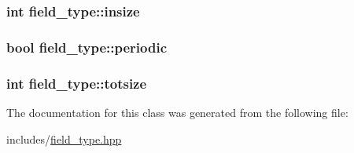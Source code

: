 \subsubsection[{\texorpdfstring{insize}{insize}}]{\setlength{\rightskip}{0pt plus 5cm}int field\+\_\+type\+::insize\hspace{0.3cm}{\ttfamily [protected]}}\hypertarget{classfield__type_adcbc745f653a086ececd263baddde7f1}{}\label{classfield__type_adcbc745f653a086ececd263baddde7f1}
\subsubsection[{\texorpdfstring{periodic}{periodic}}]{\setlength{\rightskip}{0pt plus 5cm}bool field\+\_\+type\+::periodic\hspace{0.3cm}{\ttfamily [protected]}}\hypertarget{classfield__type_a44d8b06e823939f2dda6706cb38a3280}{}\label{classfield__type_a44d8b06e823939f2dda6706cb38a3280}
\subsubsection[{\texorpdfstring{totsize}{totsize}}]{\setlength{\rightskip}{0pt plus 5cm}int field\+\_\+type\+::totsize\hspace{0.3cm}{\ttfamily [protected]}}\hypertarget{classfield__type_ad74b0d86e6384925090cdf090f1e90f5}{}\label{classfield__type_ad74b0d86e6384925090cdf090f1e90f5}


The documentation for this class was generated from the following file\+:\begin{DoxyCompactItemize}
\item 
includes/\hyperlink{field__type_8hpp}{field\+\_\+type.\+hpp}\end{DoxyCompactItemize}
